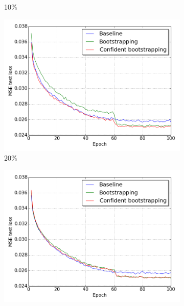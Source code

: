 \begin{figure}[H]
\begin{subfigure}{0.31\textwidth}
\caption{10\% } \label{fig:app_E2_1_lc}
\vspace{-0.1cm} %
\end{subfigure}
\hspace*{\fill} %
\begin{subfigure}{0.31\textwidth}
\includegraphics[width=\textwidth]{figs/E2/lc_2.png}
\caption{20\% } \label{fig:app_E2_2_lc}
\vspace{-0.1cm} %
\end{subfigure}
\begin{subfigure}{0.31\textwidth}
\includegraphics[width=\textwidth]{figs/E2/lc_3.png}

\end{subfigure}
\end{figure}
